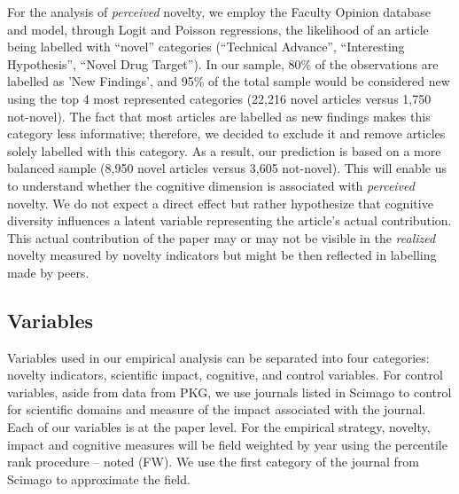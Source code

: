         
        For the analysis of \textit{perceived} novelty, we employ the Faculty Opinion database and model, through Logit and Poisson regressions, the likelihood of an article being labelled with ``novel'' categories (``Technical Advance'', ``Interesting Hypothesis'', ``Novel Drug Target''). In our sample, 80\% of the observations are labelled as 'New Findings', and 95\% of the total sample would be considered new using the top 4 most represented categories (22,216 novel articles versus 1,750 not-novel). The fact that most articles are labelled as new findings makes this category less informative; therefore, we decided to exclude it and remove articles solely labelled with this category. As a result, our prediction is based on a more balanced sample (8,950 novel articles versus 3,605 not-novel). This will enable us to understand whether the cognitive dimension is associated with \textit{perceived} novelty. We do not expect a direct effect but rather hypothesize that cognitive diversity influences a latent variable representing the article's actual contribution. This actual contribution of the paper may or may not be visible in the \textit{realized} novelty measured by novelty indicators but might be then reflected in labelling made by peers. 
        

\subsection{Variables}  

        
Variables used in our empirical analysis can be separated into four categories: novelty indicators, scientific impact, cognitive, and control variables. For control variables, aside from data from PKG, we use journals listed in Scimago to control for scientific domains and measure of the impact associated with the journal. Each of our variables is at the paper level. For the empirical strategy, novelty, impact and cognitive measures will be field weighted by year using the percentile rank procedure -- noted (FW). We use the first category of the journal from Scimago to approximate the field. %

